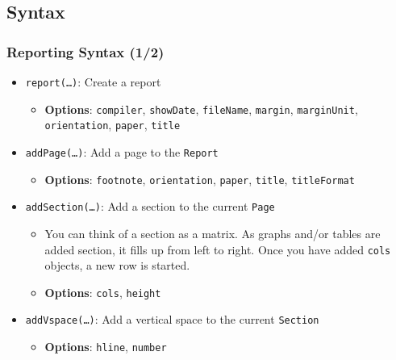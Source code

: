 \documentclass[10pt]{beamer}
\newcommand{\myitem}{\item[$\bullet$]}
\begin{document}
\subsection{Syntax}
\begin{frame}
  \frametitle{Reporting Syntax (1/2)}
  \begin{itemize}
  \myitem \texttt{report(\ldots)}: Create a report
    \begin{itemize}
    \myitem \textbf{Options}: \texttt{compiler}, \texttt{showDate}, \texttt{fileName}, \texttt{margin}, \texttt{marginUnit}, \texttt{orientation}, \texttt{paper}, \texttt{title}
    \end{itemize}
  \myitem \texttt{addPage(\ldots)}: Add a page to the \texttt{Report}
    \begin{itemize}
    \myitem \textbf{Options}: \texttt{footnote}, \texttt{orientation}, \texttt{paper}, \texttt{title}, \texttt{titleFormat}
    \end{itemize}
  \myitem \texttt{addSection(\ldots)}: Add a section to the current \texttt{Page}
    \begin{itemize}
    \myitem You can think of a section as a matrix. As graphs and/or tables are added section, it fills up from left to right. Once you have added \texttt{cols} objects, a new row is started.
    \myitem \textbf{Options}: \texttt{cols}, \texttt{height}
    \end{itemize}
  \myitem \texttt{addVspace(\ldots)}: Add a vertical space to the current \texttt{Section}
    \begin{itemize}
    \myitem \textbf{Options}: \texttt{hline}, \texttt{number}
    \end{itemize}
  \end{itemize}
\end{frame}
\end{document}
